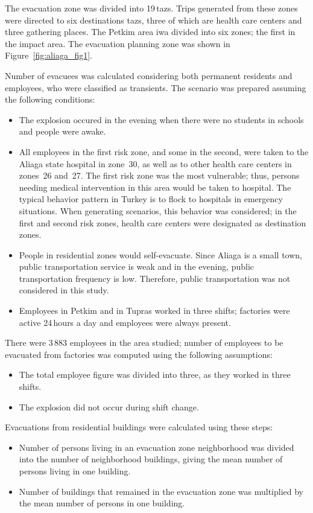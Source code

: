 The evacuation zone was divided into 19\,\glspl{taz}. Trips generated from these zones were directed to six destinations \glspl{taz}, three of which are health care centers and three gathering places. The Petkim area iwa divided into six zones; the first in the impact area. The evacuation planning zone was shown in Figure~\ref{fig:aliaga_fig1}.

Number of evacuees was calculated considering both permanent residents and employees, who were classified as transients. The scenario was prepared assuming the following conditions:
%
\begin{itemize}\styleItemize
\item The explosion occured in the evening when there were no students in schools and people were awake.
%
\item All employees in the first risk zone, and some in the second, were taken to the Aliaga state hospital in zone~30, as well as to other health care centers in zones~26 and~27. The first risk zone was the most vulnerable; thus, persons needing medical intervention in this area would be taken to hospital. The typical behavior pattern in Turkey is to flock to hospitals in emergency situations. When generating scenarios, this behavior was considered; in the first and second risk zones, health care centers were designated as destination zones.
%
\item People in residential zones would self-evacuate. Since Aliaga is a small town, public transportation service is weak and in the evening, public transportation frequency is low. Therefore, public transportation was not considered in this study.
%
\item Employees in Petkim and in Tupras worked in three shifts; factories were active 24\,hours a day and employees were always present.
\end{itemize}

There were 3\,883 employees in the area studied; number of employees to be evacuated from factories was computed using the following assumptions:
%
\begin{itemize}\styleItemize
\item The total employee figure was divided into three, as they worked in three shifts.
%
\item The explosion did not occur during shift change.
\end{itemize}

Evacuations from residential buildings were calculated using these steps:
%
\begin{itemize}\styleItemize
\item Number of persons living in an evacuation zone neighborhood was divided into the number of neighborhood buildings, giving the mean number of persons living in one building.
%
\item Number of buildings that remained in the evacuation zone was multiplied by the mean number of persons in one building.
\end{itemize}


